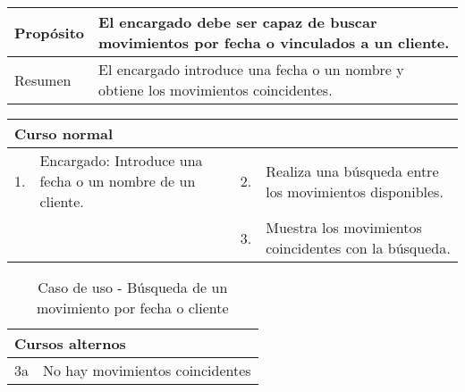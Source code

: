 \begin{table}[H]
	\centering
	\begin{tabular}{| m{} | m{} | m{} | m{} |}
		\hline
		Propósito & \multicolumn{3}{m{0.67\textwidth}|}{El encargado debe ser capaz de buscar movimientos por fecha o vinculados a un cliente.}  \\ 
		\hline
		Resumen & \multicolumn{3}{m{0.67\textwidth}|}{El encargado introduce una fecha o un nombre y obtiene los movimientos coincidentes.} \\ 
		\hline
	\end{tabular}
\end{table}


\begin{table}[H]
	\centering
	\begin{tabular}{| m{} | m{} | m{} | m{} |}
		\hline
		\multicolumn{4}{|m{0.9\textwidth}|}{Curso normal}     \\ 
		\hline
		1. & Encargado: Introduce una fecha o un nombre de un cliente. & 2. &  Realiza una búsqueda entre los movimientos disponibles.  \\ 
		\hline
		&  & 3. &  Muestra los movimientos coincidentes con la búsqueda.  \\ 
		\hline
	\end{tabular}
\end{table}

\begin{table}[H]
	\centering
	\begin{tabular}{| m{} | m{} | m{} | m{} |}
		\hline
		\multicolumn{4}{|m{0.9\textwidth}|}{Cursos alternos}     \\ 
		\hline
		3a & \multicolumn{3}{m{0.67\textwidth}|}{No hay movimientos coincidentes} \\ 
		\hline
	\end{tabular}
	\caption{Caso de uso - Búsqueda de un movimiento por fecha o cliente}
\end{table}

\newpage


